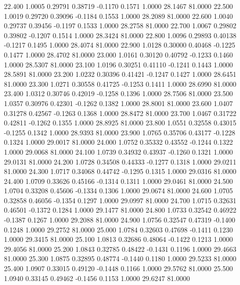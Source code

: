   22.400   1.0005   0.29791   0.38719  -0.1170   0.1571   1.0000  28.1467  81.0000
  22.500   1.0019   0.29720   0.39096  -0.1184   0.1553   1.0000  28.2089  81.0000
  22.600   1.0040   0.29737   0.39456  -0.1197   0.1533   1.0000  28.2758  81.0000
  22.700   1.0067   0.29802   0.39802  -0.1207   0.1514   1.0000  28.3424  81.0000
  22.800   1.0096   0.29893   0.40138  -0.1217   0.1495   1.0000  28.4074  81.0000
  22.900   1.0128   0.30000   0.40468  -0.1225   0.1477   1.0000  28.4702  81.0000
  23.000   1.0161   0.30120   0.40792  -0.1233   0.1460   1.0000  28.5307  81.0000
  23.100   1.0196   0.30251   0.41110  -0.1241   0.1443   1.0000  28.5891  81.0000
  23.200   1.0232   0.30396   0.41421  -0.1247   0.1427   1.0000  28.6451  81.0000
  23.300   1.0271   0.30558   0.41725  -0.1253   0.1411   1.0000  28.6990  81.0000
  23.400   1.0312   0.30746   0.42019  -0.1258   0.1396   1.0000  28.7506  81.0000
  23.500   1.0357   0.30976   0.42301  -0.1262   0.1382   1.0000  28.8001  81.0000
  23.600   1.0407   0.31278   0.42567  -0.1263   0.1368   1.0000  28.8472  81.0000
  23.700   1.0467   0.31722   0.42811  -0.1262   0.1355   1.0000  28.8925  81.0000
  23.800   1.0551   0.32558   0.43015  -0.1255   0.1342   1.0000  28.9393  81.0000
  23.900   1.0765   0.35706   0.43177  -0.1228   0.1324   1.0000  29.0017  81.0000
  24.000   1.0752   0.35332   0.43552  -0.1244   0.1322   1.0000  29.0068  81.0000
  24.100   1.0739   0.34932   0.43937  -0.1260   0.1321   1.0000  29.0131  81.0000
  24.200   1.0728   0.34508   0.44333  -0.1277   0.1318   1.0000  29.0211  81.0000
  24.300   1.0717   0.34068   0.44742  -0.1295   0.1315   1.0000  29.0316  81.0000
  24.400   1.0709   0.33626   0.45166  -0.1314   0.1311   1.0000  29.0461  81.0000
  24.500   1.0704   0.33208   0.45606  -0.1334   0.1306   1.0000  29.0674  81.0000
  24.600   1.0705   0.32858   0.46056  -0.1354   0.1297   1.0000  29.0997  81.0000
  24.700   1.0715   0.32631   0.46501  -0.1372   0.1284   1.0000  29.1477  81.0000
  24.800   1.0733   0.32542   0.46922  -0.1387   0.1267   1.0000  29.2088  81.0000
  24.900   1.0756   0.32547   0.47319  -0.1400   0.1248   1.0000  29.2752  81.0000
  25.000   1.0784   0.32603   0.47698  -0.1411   0.1230   1.0000  29.3415  81.0000
  25.100   1.0813   0.32686   0.48064  -0.1422   0.1213   1.0000  29.4056  81.0000
  25.200   1.0843   0.32785   0.48422  -0.1431   0.1196   1.0000  29.4663  81.0000
  25.300   1.0875   0.32895   0.48774  -0.1440   0.1180   1.0000  29.5233  81.0000
  25.400   1.0907   0.33015   0.49120  -0.1448   0.1166   1.0000  29.5762  81.0000
  25.500   1.0940   0.33145   0.49462  -0.1456   0.1153   1.0000  29.6247  81.0000
